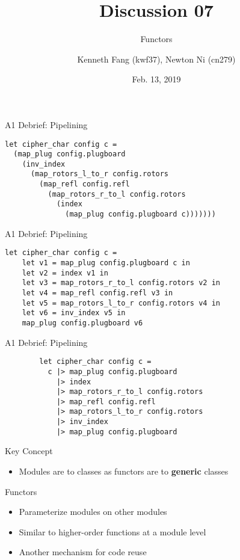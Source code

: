 \documentclass{beamer}
\title{Discussion 07}
\subtitle{Functors}
\author{Kenneth Fang (kwf37), Newton Ni (cn279)}
\date{Feb. 13, 2019}
\begin{document}
    \begin{frame}
        \titlepage{}
    \end{frame}

    \begin{frame}[fragile=singleslide]{A1 Debrief: Pipelining}
        \begin{verbatim}
let cipher_char config c =
  (map_plug config.plugboard
    (inv_index
      (map_rotors_l_to_r config.rotors
        (map_refl config.refl
          (map_rotors_r_to_l config.rotors
            (index
              (map_plug config.plugboard c)))))))
        \end{verbatim}
    \end{frame}

    \begin{frame}[fragile=singleslide]{A1 Debrief: Pipelining}
        \begin{verbatim}
let cipher_char config c =
    let v1 = map_plug config.plugboard c in
    let v2 = index v1 in
    let v3 = map_rotors_r_to_l config.rotors v2 in
    let v4 = map_refl config.refl v3 in
    let v5 = map_rotors_l_to_r config.rotors v4 in
    let v6 = inv_index v5 in
    map_plug config.plugboard v6
        \end{verbatim}
    \end{frame}

    \begin{frame}[fragile=singleslide]{A1 Debrief: Pipelining}
        \begin{verbatim}
        let cipher_char config c =
          c |> map_plug config.plugboard
            |> index
            |> map_rotors_r_to_l config.rotors
            |> map_refl config.refl
            |> map_rotors_l_to_r config.rotors
            |> inv_index
            |> map_plug config.plugboard
        \end{verbatim}
    \end{frame}

    \begin{frame}{Key Concept}
        \begin{itemize}
            \item Modules are to classes as functors are to \textbf{generic} classes
        \end{itemize}
    \end{frame}

    \begin{frame}{Functors}
        \begin{itemize}
            \item<1-> Parameterize modules on other modules
            \item<2-> Similar to higher-order functions at a module level
            \item<3-> Another mechanism for code reuse
        \end{itemize} 
    \end{frame}
\end{document}
